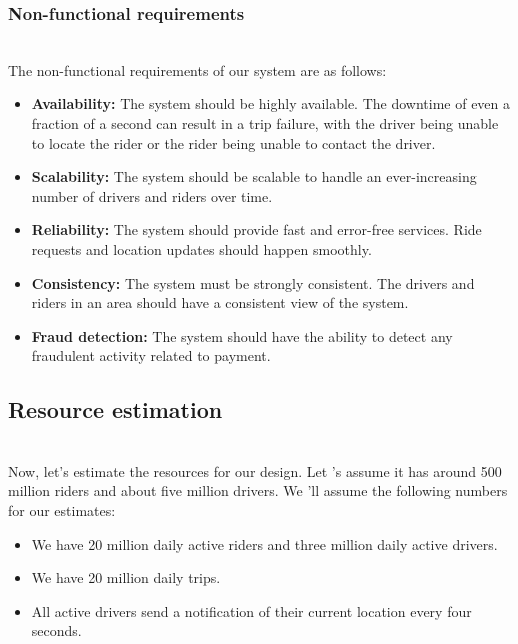 \subsubsection{Non-functional requirements}\label{ZHOw7xVdh1rCBj1Mu27G0}
\\
The non-functional requirements of our system are as follows:

\begin{itemize}
\item
\protect{}\label{7ESv-SWI3Mj40s3lb5UF6}
\textbf{Availability:} The system should be highly available. The downtime of even a fraction of a second can result in a trip failure, with the driver being unable to locate the rider or the rider being unable to contact the driver.
\item
\protect{}\label{wQarkrFXQLuwIoE8qJauE}
\textbf{Scalability:} The system should be scalable to handle an ever-increasing number of drivers and riders over time.
\item
\protect{}\label{wsAEOZTGsEkKdFUUrYnb8}
\textbf{Reliability:} The system should provide fast and error-free services. Ride requests and location updates should happen smoothly.
\item
\protect{}\label{XOgWOaD0sQ4Otrbv83T6z}
\textbf{Consistency:} The system must be strongly consistent. The drivers and riders in an area should have a consistent view of the system.
\item
\protect{}\label{zOjE2wLXx8RkMVJ7Of_Rv}
\textbf{Fraud detection:} The system should have the ability to detect any fraudulent activity related to payment.
\end{itemize}

\subsection{Resource estimation}\label{cNrd_UH5DCl82jczIUCxv}
\\
Now, let's estimate the resources for our design. Let 's assume it has around 500 million riders and about five million drivers. We
'll assume the following numbers for our estimates:

\begin{itemize}
\item
\protect{}\label{aF0aZCaz9a8wyVveBj7q5}
We have 20 million daily active riders and three million daily active drivers.
\item
\protect{}\label{D7sRRzrLmQev68xzxuv_R}
We have 20 million daily trips.
\item
\protect{}\label{g9BNBTOhMZzqgHg8tgGGj}
All active drivers send a notification of their current location every four seconds.
\end{itemize}

